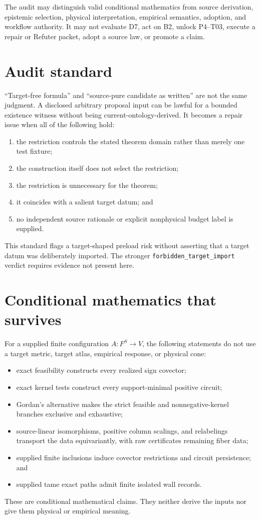 \documentclass[11pt]{article}
\begin{document}
The audit may distinguish valid conditional mathematics from source
derivation, epistemic selection, physical interpretation, empirical semantics,
adoption, and workflow authority.  It may not evaluate D7, act on B2, unlock
P4--T03, execute a repair or Refuter packet, adopt a source law, or promote a
claim.

\section{Audit standard}

``Target-free formula'' and ``source-pure candidate as written'' are not the
same judgment.  A disclosed arbitrary proposal input can be lawful for a
bounded existence witness without being current-ontology-derived.  It becomes
a repair issue when all of the following hold:
\begin{enumerate}[leftmargin=*]
  \item the restriction controls the stated theorem domain rather than merely
  one test fixture;
  \item the construction itself does not select the restriction;
  \item the restriction is unnecessary for the theorem;
  \item it coincides with a salient target datum; and
  \item no independent source rationale or explicit nonphysical budget label
  is supplied.
\end{enumerate}
This standard flags a target-shaped preload risk without asserting that a
target datum was deliberately imported.  The stronger
\texttt{forbidden\_target\_import} verdict requires evidence not present here.

\section{Conditional mathematics that survives}

For a supplied finite configuration $A:F^S\to V$, the following statements do
not use a target metric, target atlas, empirical response, or physical cone:
\begin{itemize}[leftmargin=*]
  \item exact feasibility constructs every realized sign covector;
  \item exact kernel tests construct every support-minimal positive circuit;
  \item Gordan's alternative makes the strict feasible and nonnegative-kernel
  branches exclusive and exhaustive;
  \item source-linear isomorphisms, positive column scalings, and relabelings
  transport the data equivariantly, with raw certificates remaining fiber
  data;
  \item supplied finite inclusions induce covector restrictions and circuit
  persistence; and
  \item supplied tame exact paths admit finite isolated wall records.
\end{itemize}
These are conditional mathematical claims.  They neither derive the inputs nor
give them physical or empirical meaning.
\end{document}
